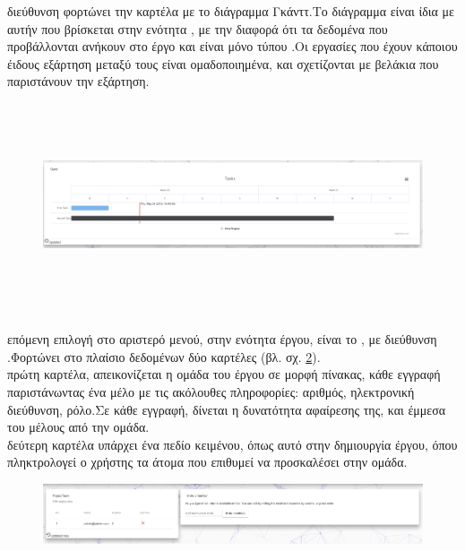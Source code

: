 \pagebreak

\subsubsection*{}
 διεύθυνση  φορτώνει την καρτέλα με το διάγραμμα Γκάνττ.Το διάγραμμα είναι ίδια με αυτήν που βρίσκεται στην ενότητα , με την διαφορά ότι τα δεδομένα που προβάλλονται ανήκουν στο έργο και είναι μόνο τύπου .Οι εργασίες που έχουν κάποιου έιδους εξάρτηση μεταξύ τους είναι ομαδοποιημένα, και σχετίζονται με βελάκια που παριστάνουν την εξάρτηση.

\begin{figure}[!htb]
\includegraphics[width=\linewidth, height=6cm]{images/projectGantt.png}
\caption{}
\label{fig:projectGantt}
\end{figure}

\subsubsection*{}
 επόμενη επιλογή στο αριστερό μενού, στην ενότητα έργου, είναι το , με διεύθυνση .Φορτώνει στο πλαίσιο δεδομένων δύο καρτέλες (βλ. σχ. \ref{fig:projectTeam}).\\
 πρώτη καρτέλα, απεικονίζεται η ομάδα του έργου σε μορφή πίνακας, κάθε εγγραφή παριστάνωντας ένα μέλο με τις ακόλουθες πληροφορίες: αριθμός, ηλεκτρονική διεύθυνση, ρόλο.Σε κάθε εγγραφή, δίνεται η δυνατότητα αφαίρεσης της, και έμμεσα του μέλους από την ομάδα.\\
 δεύτερη καρτέλα υπάρχει ένα πεδίο κειμένου, όπως αυτό στην δημιουργία έργου, όπου πληκτρολογεί ο χρήστης τα άτομα που επιθυμεί να προσκαλέσει στην ομάδα.

\begin{figure}[!htb]
\includegraphics[width=\linewidth]{images/projectTeam.png}
\caption{}
\label{fig:projectTeam}
\end{figure}

